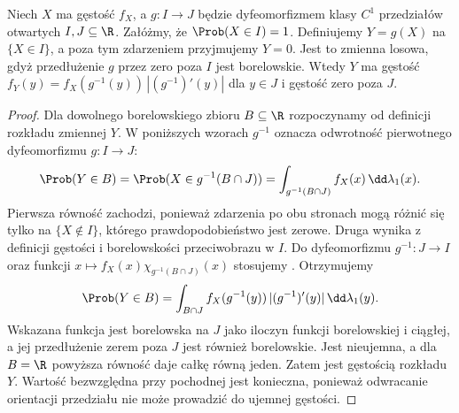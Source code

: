 \begin{stwierdzenie}
Niech $X$ ma gęstość $f_X$, a $g:I\to J$ będzie
dyfeomorfizmem klasy $C^1$ przedziałów otwartych
$I,J\subseteq\R$. Załóżmy, że $\Prob(X\in I)=1$.
Definiujemy $Y=g(X)$ na $\{X\in I\}$, a poza tym
zdarzeniem przyjmujemy $Y=0$. Jest to zmienna losowa,
gdyż przedłużenie $g$ przez zero poza $I$ jest borelowskie.
Wtedy $Y$ ma gęstość
$f_Y(y)=f_X(g^{-1}(y))\,|(g^{-1})'(y)|$ dla $y\in J$
i gęstość zero poza $J$.
\end{stwierdzenie}
\begin{proof}
Dla dowolnego borelowskiego zbioru $B\subseteq\R$
rozpoczynamy od definicji rozkładu zmiennej $Y$.
W poniższych wzorach $g^{-1}$ oznacza odwrotność
pierwotnego dyfeomorfizmu $g:I\to J$: 
\[
\Prob(Y\in B)=\Prob(X\in g^{-1}(B\cap J))
=\int_{g^{-1}(B\cap J)}f_X(x)\,\dd\lambda_1(x).
\]
Pierwsza równość zachodzi, ponieważ zdarzenia po obu
stronach mogą różnić się tylko na $\{X\notin I\}$, którego
prawdopodobieństwo jest zerowe. Druga wynika z definicji
gęstości i borelowskości przeciwobrazu w $I$.
Do dyfeomorfizmu $g^{-1}:J\to I$ oraz funkcji
$x\mapsto f_X(x)\chi_{g^{-1}(B\cap J)}(x)$ stosujemy
.
Otrzymujemy
\[
\Prob(Y\in B)=\int_{B\cap J}
 f_X(g^{-1}(y))\,|(g^{-1})'(y)|\,\dd\lambda_1(y).
\]
Wskazana funkcja jest borelowska na $J$ jako iloczyn
funkcji borelowskiej i ciągłej, a jej przedłużenie zerem
poza $J$ jest również borelowskie. Jest nieujemna, a
dla $B=\R$ powyższa równość daje całkę równą jeden.
Zatem jest gęstością rozkładu $Y$.
Wartość bezwzględna przy pochodnej jest konieczna,
ponieważ odwracanie orientacji przedziału nie może
prowadzić do ujemnej gęstości.
\end{proof}

